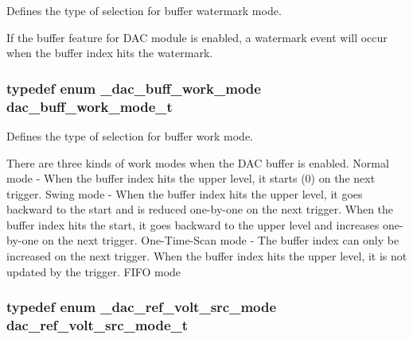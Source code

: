 Defines the type of selection for buffer watermark mode. 

If the buffer feature for D\+AC module is enabled, a watermark event will occur when the buffer index hits the watermark. 
\subsubsection[{\texorpdfstring{dac\+\_\+buff\+\_\+work\+\_\+mode\+\_\+t}{dac_buff_work_mode_t}}]{\setlength{\rightskip}{0pt plus 5cm}typedef enum {\bf \+\_\+dac\+\_\+buff\+\_\+work\+\_\+mode}  {\bf dac\+\_\+buff\+\_\+work\+\_\+mode\+\_\+t}}\hypertarget{group__dac__hal_ga3d2ac50178e33d5ce3529f4e9af80b8b}{}\label{group__dac__hal_ga3d2ac50178e33d5ce3529f4e9af80b8b}


Defines the type of selection for buffer work mode. 

There are three kinds of work modes when the D\+AC buffer is enabled. Normal mode -\/ When the buffer index hits the upper level, it starts (0) on the next trigger. Swing mode -\/ When the buffer index hits the upper level, it goes backward to the start and is reduced one-\/by-\/one on the next trigger. When the buffer index hits the start, it goes backward to the upper level and increases one-\/by-\/one on the next trigger. One-\/\+Time-\/\+Scan mode -\/ The buffer index can only be increased on the next trigger. When the buffer index hits the upper level, it is not updated by the trigger. F\+I\+FO mode 
\subsubsection[{\texorpdfstring{dac\+\_\+ref\+\_\+volt\+\_\+src\+\_\+mode\+\_\+t}{dac_ref_volt_src_mode_t}}]{\setlength{\rightskip}{0pt plus 5cm}typedef enum {\bf \+\_\+dac\+\_\+ref\+\_\+volt\+\_\+src\+\_\+mode}  {\bf dac\+\_\+ref\+\_\+volt\+\_\+src\+\_\+mode\+\_\+t}}\hypertarget{group__dac__hal_gafb7036980fcc7a987015323662f6bd96}{}\label{group__dac__hal_gafb7036980fcc7a987015323662f6bd96}


